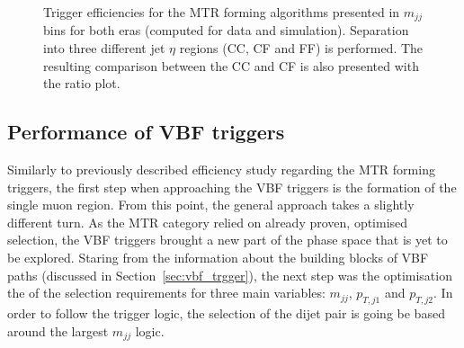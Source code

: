 \begin{figure}[htbp]
{    }
  \caption{Trigger efficiencies for the MTR forming algorithms presented in $m_{jj}$ bins for both eras (computed for data and simulation). Separation into three different jet $\eta$ regions (CC, CF and FF) is performed. The resulting comparison between the CC and CF is also presented with the ratio plot.}
  \label{fig:metmht_test}
\end{figure}







\subsection{Performance of VBF triggers}
\label{sec:vbf_trigger_performance}

\hspace{10pt} Similarly to previously described efficiency study regarding the MTR forming triggers, the first step when approaching the VBF triggers is the formation of the single muon region. From this point, the general approach takes a slightly different turn. As the MTR category relied on already proven, optimised selection, the VBF triggers brought a new part of the phase space that is yet to be explored. Staring from the information about the building blocks of VBF paths (discussed in Section~\ref{sec:vbf_trgger}), the next step was the optimisation the of the selection requirements for three main variables: $m_{jj}$, $p_{T,j1}$ and $p_{T,j2}$. In order to follow the trigger logic, the selection of the dijet pair is going be based around the largest $m_{jj}$ logic.

